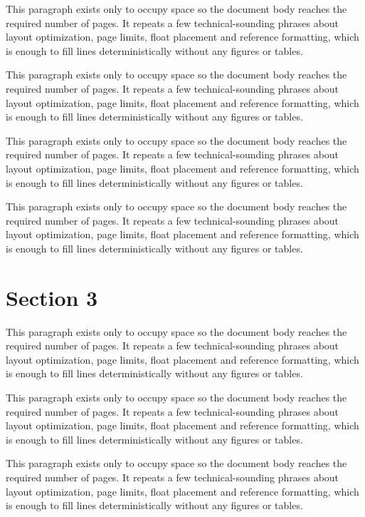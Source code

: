 \documentclass[10pt,letterpaper]{article}
\begin{document}
This paragraph exists only to occupy space so the document body reaches the required number of pages. It repeats a few technical-sounding phrases about layout optimization, page limits, float placement and reference formatting, which is enough to fill lines deterministically without any figures or tables.

This paragraph exists only to occupy space so the document body reaches the required number of pages. It repeats a few technical-sounding phrases about layout optimization, page limits, float placement and reference formatting, which is enough to fill lines deterministically without any figures or tables.

This paragraph exists only to occupy space so the document body reaches the required number of pages. It repeats a few technical-sounding phrases about layout optimization, page limits, float placement and reference formatting, which is enough to fill lines deterministically without any figures or tables.

This paragraph exists only to occupy space so the document body reaches the required number of pages. It repeats a few technical-sounding phrases about layout optimization, page limits, float placement and reference formatting, which is enough to fill lines deterministically without any figures or tables.

\section{Section 3}
This paragraph exists only to occupy space so the document body reaches the required number of pages. It repeats a few technical-sounding phrases about layout optimization, page limits, float placement and reference formatting, which is enough to fill lines deterministically without any figures or tables.

This paragraph exists only to occupy space so the document body reaches the required number of pages. It repeats a few technical-sounding phrases about layout optimization, page limits, float placement and reference formatting, which is enough to fill lines deterministically without any figures or tables.

This paragraph exists only to occupy space so the document body reaches the required number of pages. It repeats a few technical-sounding phrases about layout optimization, page limits, float placement and reference formatting, which is enough to fill lines deterministically without any figures or tables.
\end{document}
